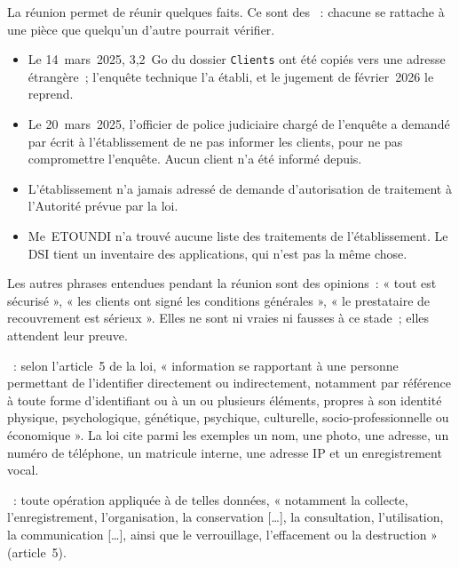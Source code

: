 La réunion permet de réunir quelques faits. Ce sont des
~: chacune se rattache à une pièce que quelqu'un
d'autre pourrait vérifier.

\begin{itemize}
    \item Le 14~mars~2025, 3,2~Go du dossier \texttt{Clients} ont été copiés
          vers une adresse étrangère~; l'enquête technique l'a établi, et le
          jugement de février~2026 le reprend.
    \item Le 20~mars~2025, l'officier de police judiciaire chargé de
          l'enquête a demandé par écrit à l'établissement de ne pas informer
          les clients, pour ne pas compromettre l'enquête. Aucun client n'a
          été informé depuis.
    \item L'établissement n'a jamais adressé de demande d'autorisation de
          traitement à l'Autorité prévue par la loi.
    \item Me~ETOUNDI n'a trouvé aucune liste des traitements de
          l'établissement. Le DSI tient un inventaire des applications, qui
          n'est pas la même chose.
\end{itemize}

Les autres phrases entendues pendant la réunion sont des opinions~: « tout
est sécurisé », « les clients ont signé les conditions générales », « le
prestataire de recouvrement est sérieux ». Elles ne sont ni vraies ni
fausses à ce stade~; elles attendent leur preuve.

\begin{boxdef}
~: selon l'article~5 de la loi,
« information se rapportant à une personne permettant de l'identifier
directement ou indirectement, notamment par référence à toute forme
d'identifiant ou à un ou plusieurs éléments, propres à son identité
physique, psychologique, génétique, psychique, culturelle,
socio-professionnelle ou économique ». La loi cite parmi les exemples un
nom, une photo, une adresse, un numéro de téléphone, un matricule interne,
une adresse IP et un enregistrement vocal.

\smallskip
{}~: toute opération appliquée à de telles données,
« notamment la collecte, l'enregistrement, l'organisation, la conservation
[\ldots], la consultation, l'utilisation, la communication [\ldots], ainsi
que le verrouillage, l'effacement ou la destruction » (article~5).
\end{boxdef}

